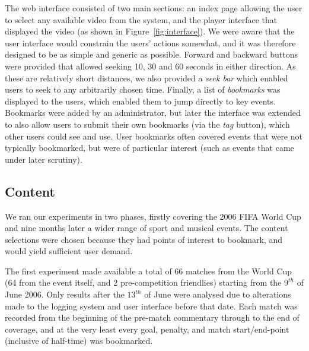 \documentclass[a4paper,11pt]{article}
\begin{document}
The web interface consisted of two main sections: an index page allowing the user to select any available video from the system, and the player interface that displayed the video (as shown in Figure~\ref{fig:interface}). We were aware that the user interface would constrain the users' actions somewhat, and it was therefore designed to be as simple and generic as possible. %
Forward and backward buttons were provided that allowed seeking 10, 30 and 60 seconds in either direction. As these are relatively short distances, we also provided a \emph{seek bar} which enabled users to seek to any arbitrarily chosen time. Finally, a list of \emph{bookmarks} was displayed to the users, which enabled them to jump directly to key events. Bookmarks were added by an administrator, but later the interface was extended to also allow users to submit their own bookmarks (via the \emph{tag} button), which other users could see and use. User bookmarks often covered events that were not typically bookmarked, but were of particular interest (such as events that came under later scrutiny).

\subsection{Content}
We ran our experiments in two phases, firstly covering the 2006 FIFA World Cup and nine months later a wider range of sport and musical events. The content selections were chosen because they had points of interest to bookmark, and would yield sufficient user demand.

The first experiment made available a total of 66 matches from the World Cup (64 from the event itself, and 2 pre-competition friendlies) starting from the $9^{th}$ of June 2006. Only results after the $13^{th}$ of June were analysed due to alterations made to the logging system and user interface before that date. Each match was recorded from the beginning of the pre-match commentary through to the end of coverage, and at the very least every goal, penalty, and match start/end-point (inclusive of half-time) was bookmarked.
\end{document}
